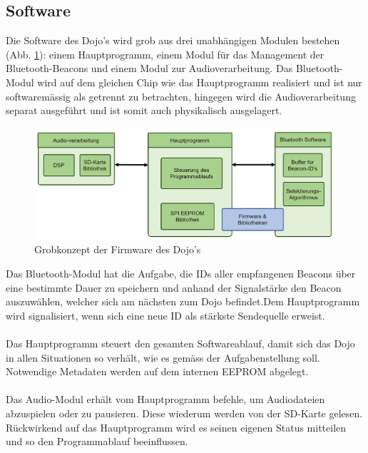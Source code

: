 \documentclass[10pt,a4paper,oneside]{99_fhnwreport}
\begin{document}
\subsection{Software} \label{sec:software}

Die Software des Dojo's wird grob aus drei unabhängigen Modulen bestehen (Abb. \ref{fig:grobkonzept}): einem Hauptprogramm, einem Modul für das Management der Bluetooth-Beacons und einem Modul zur Audioverarbeitung. Das Bluetooth-Modul wird auf dem gleichen Chip wie das Hauptprogramm realisiert und ist nur softwaremässig als getrennt zu betrachten, hingegen wird die Audioverarbeitung separat ausgeführt und ist somit auch physikalisch ausgelagert.

\begin{figure}[htb]
\includegraphics[width=\textwidth]{grobkonzept_software.png}
\caption{Grobkonzept der Firmware des Dojo's} %
\label{fig:grobkonzept}
\end{figure}

Das Bluetooth-Modul hat die Aufgabe, die IDs aller empfangenen Beacons über eine bestimmte Dauer zu speichern und anhand der Signalstärke den Beacon auszuwählen, welcher sich am nächsten zum Dojo befindet.Dem Hauptprogramm wird signalisiert, wenn sich eine neue ID als stärkste Sendequelle erweist.\\
\\
Das Hauptprogramm steuert den gesamten Softwareablauf, damit sich das Dojo in allen Situationen so verhält, wie es gemäss der Aufgabenstellung soll. Notwendige Metadaten werden auf dem internen EEPROM abgelegt.\\
\\
Das Audio-Modul erhält vom Hauptprogramm befehle, um Audiodateien abzuspielen oder zu pausieren. Diese wiederum werden von der SD-Karte gelesen. Rückwirkend auf das Hauptprogramm wird es seinen eigenen Status mitteilen und so den Programmablauf beeinflussen.
\end{document}
